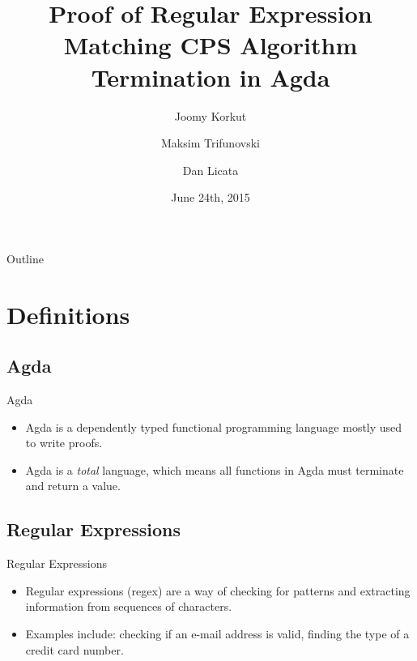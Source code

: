\documentclass{beamer}
\title{Proof of Regular Expression Matching CPS Algorithm Termination in Agda}
\author{Joomy Korkut \and Maksim Trifunovski \and Dan Licata}
\institute {
Department of Mathematics and Computer Science\\
Wesleyan University
}
\date{June 24th, 2015}
\begin{document}
\begin{frame}
\titlepage
\end{frame}

\begin{frame}{Outline}
\tableofcontents
\end{frame}

\section{Definitions}

\subsection{Agda}

\begin{frame}{Agda}
\begin{itemize}
\item Agda is a dependently typed functional programming language mostly used to write proofs.
\item Agda is a \emph{total} language, which means all functions in Agda must terminate and return a value.
\end{itemize}
\end{frame}

\subsection{Regular Expressions}

\begin{frame}{Regular Expressions}
\begin{itemize}
\item Regular expressions (regex) are a way of checking for patterns and extracting information from sequences of characters.
\item Examples include: checking if an e-mail address is valid, finding the type of a credit card number.
\end{itemize}
\end{frame}
\end{document}
